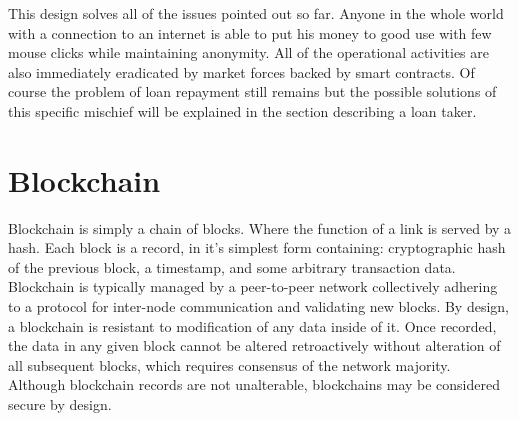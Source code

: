 \documentclass[a4paper,12pt,twoside,openany]{report}
\begin{document}
This design solves all of the issues pointed out so far. Anyone in the whole world with a connection to an internet is able to put his money to good use with few mouse clicks while maintaining anonymity. All of the operational activities are also immediately eradicated by market forces backed by smart contracts. Of course the problem of loan repayment still remains but the possible solutions of this specific mischief will be explained in the section describing a loan taker.

\section{Blockchain}

Blockchain is simply a chain of blocks. Where the function of a link is served by a hash. Each block is a record, in it's simplest form containing: cryptographic hash of the previous block, a timestamp, and some arbitrary transaction data. Blockchain is typically managed by a peer-to-peer network collectively adhering to a protocol for inter-node communication and validating new blocks. By design, a blockchain is resistant to modification of any data inside of it.  Once recorded, the data in any given block cannot be altered retroactively without alteration of all subsequent blocks, which requires consensus of the network majority. Although blockchain records are not unalterable, blockchains may be considered secure by design. 
\end{document}

